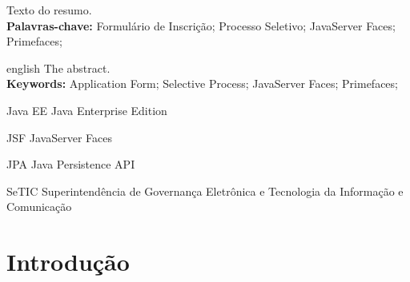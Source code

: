 \documentclass[
  10.5pt,				  %
	openright,			%
	twoside,			  %
  a5paper,
  chapter=TITLE,	%
	section=TITLE,	%
  hyphens,        %
	english,        %
	brazil          %
]{abntex2}
\begin{document}

\begin{resumo}
Texto do resumo.
\vspace{\onelineskip} \\
\noindent \textbf{Palavras-chave:} Formulário de Inscrição; Processo Seletivo; JavaServer Faces; Primefaces;
\end{resumo}
\begin{resumo}[Abstract]
\begin{otherlanguage*}{english}
The abstract.
\vspace{\onelineskip} \\
\noindent \textbf{Keywords:} Application Form; Selective Process; JavaServer Faces; Primefaces;
\end{otherlanguage*}
\end{resumo}




\begin{siglas}
  \item[Java EE] Java Enterprise Edition
  \item[JSF]     JavaServer Faces
  \item[JPA]     Java Persistence API
  \item[SeTIC]   Superintendência de Governança Eletrônica e Tecnologia da Informação e Comunicação
\end{siglas}



\tableofcontents*
\cleardoublepage



\textual%




\chapter{Introdução}
\end{document}
